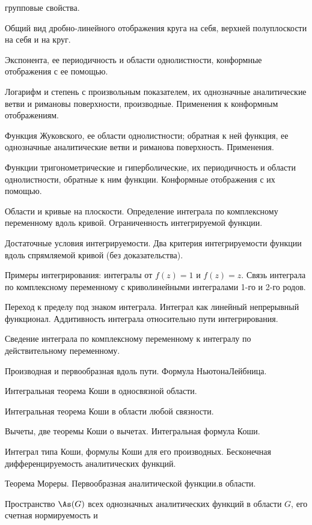 \documentclass[a4paper]{article}
\begin{document}
\begin{nums}{-2}
      групповые свойства.
\item Общий вид дробно-линейного отображения круга на себя,  верхней  полуплоскости на себя и на круг.
\item Экспонента, ее периодичность и области однолистности, конформные отображения с ее помощью.
\item Логарифм и степень с произвольным показателем, их однозначные аналитические ветви и римановы поверхности,
      производные.  Применения  к  конформным отображениям.
\item Функция Жуковского, ее области однолистности; обратная к ней функция, ее однозначные аналитические
      ветви и риманова поверхность. Применения.
\item Функции тригонометрические и гиперболические, их периодичность  и области однолистности, обратные к ним
      функции. Конформные  отображения  с их помощью.
\item Области и кривые на плоскости. Определение интеграла по комплексному переменному вдоль кривой.
      Ограниченность интегрируемой функции.
\item Достаточные условия интегрируемости. Два критерия интегрируемости функции вдоль спрямляемой кривой
      (без доказательства).
\item Примеры интегрирования: интегралы от $f(z)=1$ и $f(z)=z$. Связь  интеграла по комплексному
      переменному с криволинейными интегралами 1-го и 2-го родов.
\item Переход к пределу под знаком интеграла. Интеграл как  линейный  непрерывный функционал. Аддитивность
      интеграла относительно пути интегрирования.
\item Сведение интеграла по комплексному переменному к интегралу по действительному переменному.
\item Производная и первообразная вдоль пути. Формула Ньютона\ч Лейбница.
\item Интегральная теорема Коши в односвязной области.
\item Интегральная теорема Коши в области любой связности.
\item Вычеты, две теоремы Коши о вычетах. Интегральная формула Коши.
\item Интеграл типа Коши, формулы Коши для его производных. Бесконечная дифференцируемость аналитических функций.
\item Теорема Мореры. Первообразная аналитической функции.в области.
\item Пространство $\As(G)$ всех однозначных аналитических функций в области $G$, его счетная нормируемость и

\end{nums}
\end{document}
